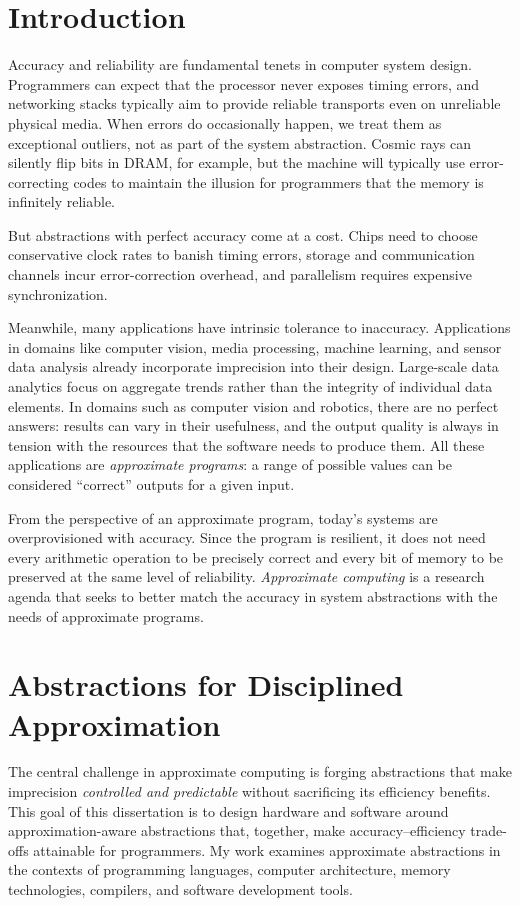 \section{Introduction}
\label{sec:intro}

Accuracy and reliability are fundamental tenets in computer system design.
Programmers can expect that the processor never exposes timing
errors, and networking stacks typically aim to provide reliable transports
even on unreliable physical media.
When errors do occasionally happen, we treat them as exceptional outliers, not
as part of the system abstraction.
Cosmic rays can silently flip bits in DRAM, for example,
but the machine will typically use error-correcting codes to
maintain the illusion for programmers that the memory is infinitely reliable.

But abstractions with perfect accuracy come at a cost.
Chips need to choose conservative clock rates to banish timing errors,
storage and communication channels incur error-correction overhead,
and parallelism requires expensive synchronization.

Meanwhile, many applications have intrinsic tolerance to inaccuracy.
Applications in domains like computer vision, media
processing, machine learning, and sensor data analysis already incorporate
imprecision into their design.
Large-scale data analytics focus on aggregate trends rather than the integrity
of individual data elements.
In domains such as computer vision and robotics, there are no perfect answers:
results can vary in their usefulness, and the output quality is always in
tension with the resources that the software needs to produce them.
All these applications are \emph{approximate
programs}: a range of possible values can be considered ``correct'' outputs
for a given input.

From the perspective of an approximate program, today's
systems are overprovisioned with accuracy. Since the program is resilient, it
does
not need every arithmetic operation to be precisely correct and every bit of
memory to be preserved at the same level of reliability.
\emph{Approximate computing} is a research agenda that seeks to better match
the accuracy in system abstractions with the needs of approximate
programs.


\section{Abstractions for Disciplined Approximation}

The central challenge in approximate computing is forging abstractions that
make imprecision \emph{controlled and predictable} without sacrificing its
efficiency benefits.
This goal of this dissertation is to design hardware and software around
approximation-aware abstractions that, together, make accuracy--efficiency
trade-offs attainable for programmers.
My work examines approximate abstractions
in the contexts of programming languages, computer architecture,
memory technologies, compilers, and software development
tools.

